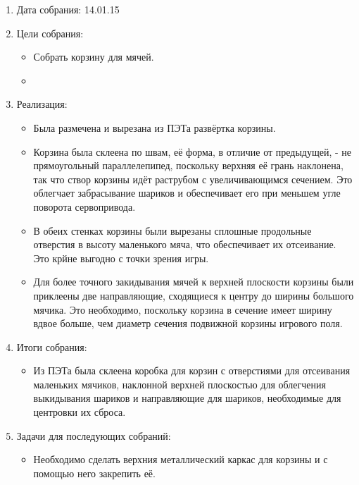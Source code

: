 \begin{enumerate}
  	
  \item Дата собрания: 14.01.15
	
  \item Цели собрания: 
  \begin{itemize}
    \item Собрать корзину для мячей.
		
	\item 
  \end{itemize}

  \item Реализация:
  \begin{itemize}
    \item Была размечена и вырезана из ПЭТа развёртка корзины. 
	
	\item Корзина была склеена по швам, её форма, в отличие от предыдущей, - не прямоугольный параллелепипед, поскольку верхняя её грань наклонена, так что створ корзины идёт раструбом с увеличивающимся сечением. Это облегчает забрасывание шариков и обеспечивает его при меньшем угле поворота сервопривода.
    
    \item В обеих стенках корзины были вырезаны сплошные продольные отверстия в высоту маленького мяча, что обеспечивает их отсеивание. Это крйне выгодно с точки зрения игры.
    
    \item Для более точного закидывания мячей к верхней плоскости корзины были приклеены две направляющие, сходящиеся к центру до ширины большого мячика. Это необходимо, поскольку корзина в сечение имеет ширину вдвое больше, чем диаметр сечения подвижной корзины игрового поля.
  
  \end{itemize}
	
  \item Итоги собрания:
  \begin{itemize}
	\item Из ПЭТа была склеена коробка для корзин с отверстиями для отсеивания маленьких мячиков, наклонной верхней плоскостью для облегчения выкидывания шариков и направляющие для шариков, необходимые для центровки их сброса.
    
  \end{itemize}
	
  \item Задачи для последующих собраний:
  \begin{itemize}
    \item Необходимо сделать верхния металлический каркас для корзины и с помощью него закрепить её.
  \end{itemize}
\end{enumerate}
\fillpage